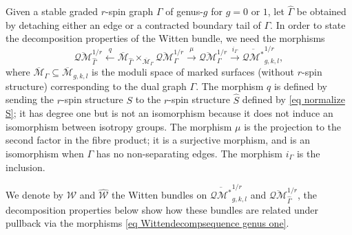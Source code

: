\documentclass[11pt]{amsart}
\theoremstyle{definition}
\theoremstyle{remark}
\newcommand{\oQMb}{{\overline{\mathcal{QM}}}}
\newcommand{\<}{\left<}
\renewcommand{\>}{\right>}
\numberwithin{equation}{section}
\def\Mbar{{\overline{\mathcal M}}}
\begin{document}
Given a stable graded $r$-spin graph $\Gamma$ of genus-$g$ for $g=0$ or $1$, let $\widehat{\Gamma}$ be obtained by detaching either an edge or a contracted boundary tail of $\Gamma$.  In order to state the decomposition properties of the Witten bundle, we need the morphisms
\begin{equation}
\label{eq Wittendecompsequence genus one}
\oQMb_{\widehat{\Gamma}}^{1/r} \xleftarrow{q} \Mbar_{\widehat{\Gamma}} \times_{\Mbar_{\Gamma}} \oQMb_{\Gamma}^{1/r} \xrightarrow{\mu} \oQMb_{\Gamma}^{1/r} \xrightarrow{i_{\Gamma}} \overline{\mathcal{QM}^*}_{g,k,l}^{1/r},
\end{equation}
where $\Mbar_{\Gamma} \subseteq \Mbar_{g,k,l}$ is the moduli space of marked surfaces (without $r$-spin structure) corresponding to the dual graph $\Gamma$.  The morphism $q$ is defined by sending the $r$-spin structure $S$ to the $r$-spin structure $\widehat{S}$ defined by \eqref{eq normalize S}; it has degree one but is not an isomorphism because it does not induce an isomorphism between isotropy groups.  The morphism $\mu$ is the projection to the second factor in the fibre product; it is a surjective morphism, and is an isomorphism when $\Gamma$ has no non-separating edges.  The morphism $i_{\Gamma}$ is the inclusion.

We denote by ${\mathcal{W}}$ and $\widehat{{\mathcal{W}}}$ the Witten bundles on $\overline{\mathcal{QM}^*}_{g,k,l}^{1/r}$ and $\oQMb_{\widehat{\Gamma}}^{1/r}$, the decomposition properties below show how these bundles are related under pullback via the morphisms \eqref{eq Wittendecompsequence genus one}.  
\end{document}
